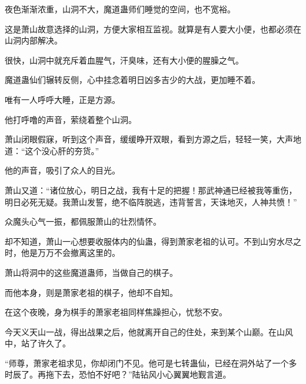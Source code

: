 \begin{this_body}
夜色渐渐浓重，山洞不大，魔道蛊师们睡觉的空间，也不宽裕。

这是萧山故意选择的山洞，方便大家相互监视。就算是有人要大小便，也都必须在山洞内部解决。

很快，山洞中就充斥着血腥气，汗臭味，还有大小便的腥臊之气。

魔道蛊仙们辗转反侧，心中挂念着明日凶多吉少的大战，更加睡不着。

唯有一人呼呼大睡，正是方源。

他打呼噜的声音，萦绕着整个山洞。

萧山闭眼假寐，听到这个声音，缓缓睁开双眼，看到方源之后，轻轻一笑，大声地道：“这个没心肝的夯货。”

他的声音，吸引了众人的目光。

萧山又道：“诸位放心，明日之战，我有十足的把握！那武神通已经被我等重伤，明日必死无疑。我萧山发誓，绝不临阵脱逃，违背誓言，天诛地灭，人神共愤！”

众魔头心气一振，都佩服萧山的壮烈情怀。

却不知道，萧山一心想要收服体内的仙蛊，得到萧家老祖的认可。不到山穷水尽之时，他是万万不会撤离这里的。

萧山将洞中的这些魔道蛊师，当做自己的棋子。

而他本身，则是萧家老祖的棋子，他却不自知。

在这个夜晚，身为棋手的萧家老祖同样焦躁担心，忧愁不安。

今天义天山一战，得出战果之后，他就离开自己的住处，来到某个山巅。在山风中，站了许久了。

“师尊，萧家老祖求见，你却闭门不见。他可是七转蛊仙，已经在洞外站了一个多时辰了。再拖下去，恐怕不好吧？”陆钻风小心翼翼地觐言道。

\end{this_body}

